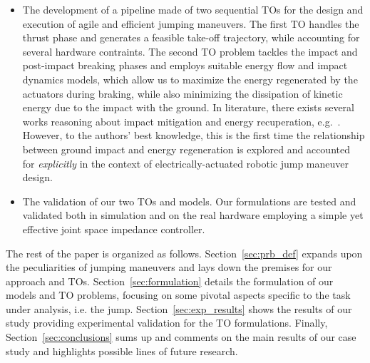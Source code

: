 \begin{itemize}
    \item The development of a pipeline made of two sequential TOs for the design and execution of agile and efficient jumping maneuvers. The first TO handles the thrust phase and generates a feasible take-off trajectory, while accounting for several hardware contraints.  The second TO problem tackles the impact and post-impact breaking phases and employs suitable energy flow and impact dynamics models, which allow us to maximize the energy regenerated by the actuators during braking, while also minimizing the dissipation of kinetic energy due to the impact with the ground. In literature, there exists several works reasoning about impact mitigation and energy recuperation, e.g.~\cite{agile_bots::katz2019mini,agile_bots::hawkes2022engineered,agile_bots::chignoli2021humanoid}. However, to the authors' best knowledge, this is the first time the relationship between ground impact and energy regeneration is explored and accounted for \textit{explicitly}  in the context of electrically-actuated robotic jump maneuver design.
    \item The validation of our two TOs and models. Our formulations are tested and validated both in simulation and on the real hardware employing a simple yet effective joint space impedance controller.
\end{itemize}
The rest of the paper is organized as follows. Section~\ref{sec:prb_def} expands upon the peculiarities of jumping maneuvers and lays down the premises for our approach and TOs. Section~\ref{sec:formulation} details the formulation of our models and TO problems, focusing on some pivotal aspects specific to the task under analysis, i.e. the jump. Section~\ref{sec:exp_results} shows the results of our study providing experimental validation for the TO formulations. Finally, Section~\ref{sec:conclusions} sums up and comments on the main results of our case study and highlights possible lines of future research.  
